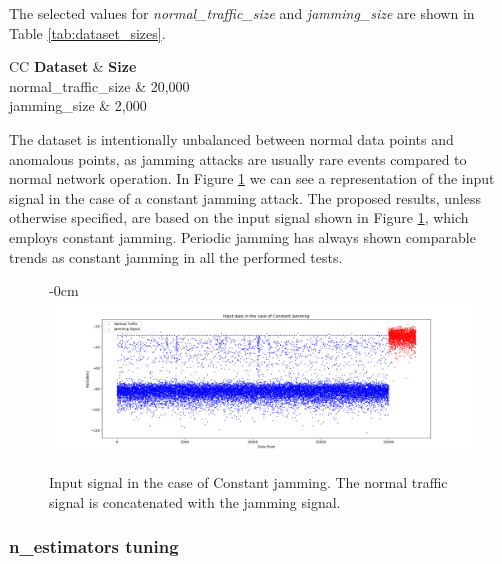 \documentclass[futureinternet,article,submit,pdftex,moreauthors]{Definitions/mdpi}
\begin{document}
The selected values for \textit{normal\_traffic\_size} and \textit{jamming\_size} are shown in Table \ref{tab:dataset_sizes}. 

\begin{table}[H]
	\caption{Dataset sizes used for the tuning and testing phases.}\label{tab:dataset_sizes}
	\begin{tabularx}{\textwidth}{CC}
	\toprule
	\textbf{Dataset} & \textbf{Size} \\
	\midrule
	normal\_traffic\_size & 20,000 \\
	jamming\_size & 2,000 \\
	\bottomrule
\end{tabularx}
\end{table}

The dataset is intentionally unbalanced between normal data points and anomalous points, as jamming attacks are usually rare events compared to normal network operation. 
In Figure \ref{fig:InputSignal} we can see a representation of the input signal in the case of a constant jamming attack. The proposed results, unless otherwise specified, are based on the input signal shown in Figure \ref{fig:InputSignal}, which employs constant jamming. Periodic jamming has always shown comparable trends as constant jamming in all the performed tests.


\begin{figure}[H]
    \begin{adjustwidth}{-\extralength}{0cm}
        \centering
        \includegraphics[width=21cm]{img/InputSignal.png}
    \end{adjustwidth}
    \caption{Input signal in the case of Constant jamming. The normal traffic signal is concatenated with the jamming signal.}
    \label{fig:InputSignal}
\end{figure}


\subsubsection{n\_estimators tuning}
\end{document}
